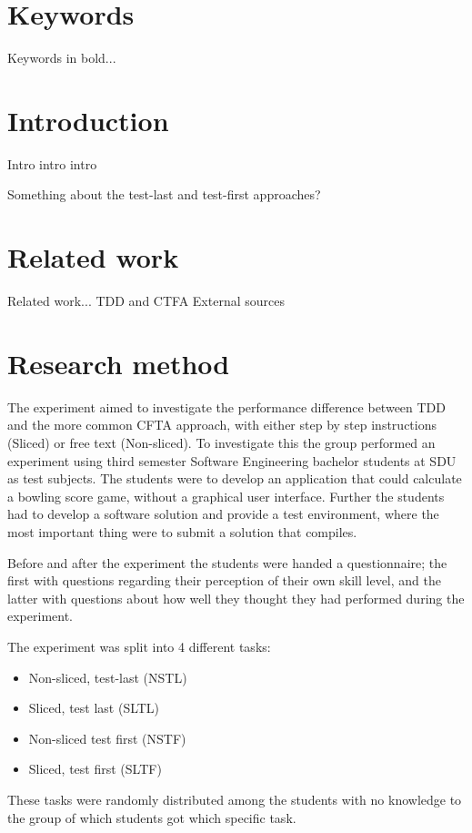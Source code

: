 \documentclass{sig-alternate-05-2015}
\begin{document}
\section{Keywords}
Keywords in bold...

\section{Introduction}
Intro intro intro

Something about the test-last and test-first approaches?

\section{Related work}
Related work...
TDD and CTFA
External sources

\section{Research method}
The experiment aimed to investigate the performance difference between TDD and the more common CFTA approach, with either step by step instructions (Sliced) or free text (Non-sliced). To investigate this the group performed an experiment using third semester Software Engineering bachelor students at SDU as test subjects.
The students were to develop an application that could calculate a bow\-ling score game, without a graphical user interface. Further the students had to develop a software solution and provide a test environment, where the most important thing were to submit a solution that compiles.


Before and after the experiment the students were handed a questionnaire; the first with questions regarding their perception of their own skill level, and the latter with questions about how well they thought they had performed during the experiment.


The experiment was split into 4 different tasks:
\begin{itemize}
	\item Non-sliced, test-last (NSTL)
	\item Sliced, test last (SLTL)
	\item Non-sliced test first (NSTF)
	\item Sliced, test first (SLTF)
\end{itemize}

These tasks were randomly distributed among the students with no knowledge to the group of which students got which specific task.
\end{document}
